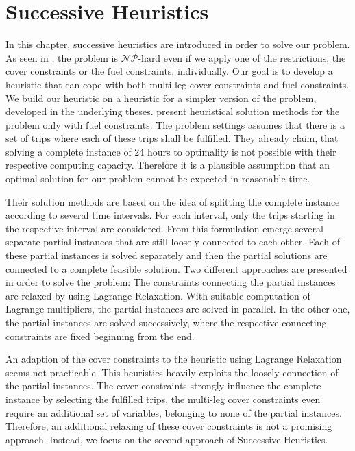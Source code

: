 \chapter{Successive Heuristics}
\label{ch:heuristics}

In this chapter, successive heuristics are introduced in order to solve our problem. As seen in , the problem is ${\mathcal{NP}\text{-hard}}$ even if we apply one of the restrictions, the cover constraints or the fuel constraints, individually. Our goal is to develop a heuristic that can cope with both multi-leg cover constraints and fuel constraints. We build our heuristic on a heuristic for a simpler version of the problem, developed in the underlying theses. \cite{Knoll} present heuristical solution methods for the problem only with fuel constraints. The problem settings assumes that there is a set of trips where each of these trips shall be fulfilled. They already claim, that solving a complete instance of 24 hours to optimality is not possible with their respective computing capacity. Therefore it is a plausible assumption that an optimal solution for our problem cannot be expected in reasonable time. 

Their solution methods are based on the idea of splitting the complete instance according to several time intervals. For each interval, only the trips starting in the respective interval are considered. From this formulation emerge several separate partial instances that are still loosely connected to each other. Each of these partial instances is solved separately and then the partial solutions are connected to a complete feasible solution. Two different approaches are presented in order to solve the problem: The constraints connecting the partial instances are relaxed by using Lagrange Relaxation. With suitable computation of Lagrange multipliers, the partial instances are solved in parallel. In the other one, the partial instances are solved successively, where the respective connecting constraints are fixed beginning from the end.

An adaption of the cover constraints to the heuristic using Lagrange Relaxation seems not practicable. This heuristics heavily exploits the loosely connection of the partial instances. The cover constraints strongly influence the complete instance by selecting the fulfilled trips, the multi-leg cover constraints even require an additional set of variables, belonging to none of the partial instances. Therefore, an additional relaxing of these cover constraints is not a promising approach. Instead, we focus on the second approach of Successive Heuristics.

